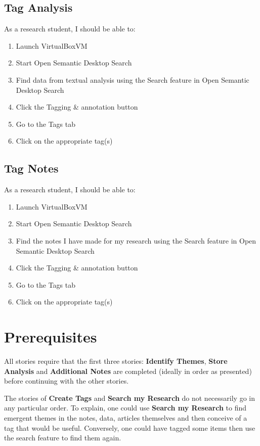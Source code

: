 \documentclass{article}
\begin{document}
\subsection*{Tag Analysis}

As a research student, I should be able to:
\begin{enumerate}
    \item Launch VirtualBoxVM
    \item Start Open Semantic Desktop Search
    \item Find data from textual analysis using the Search feature in Open Semantic Desktop Search
    \item Click the Tagging \& annotation button
    \item Go to the Tags tab
    \item Click on the appropriate tag(s)
\end{enumerate}

\subsection*{Tag Notes}

As a research student, I should be able to:
\begin{enumerate}
    \item Launch VirtualBoxVM
    \item Start Open Semantic Desktop Search
    \item Find the notes I have made for my research using the Search feature in Open Semantic Desktop Search
    \item Click the Tagging \& annotation button
    \item Go to the Tags tab
    \item Click on the appropriate tag(s)
\end{enumerate}

\section*{Prerequisites}

All stories require that the first three stories: \textbf{Identify Themes}, \textbf{Store Analysis} and \textbf{Additional Notes} are completed (ideally in order as presented) before continuing with the other stories.

The stories of \textbf{Create Tags} and \textbf{Search my Research} do not necessarily go in any particular order. To explain, one could use \textbf{Search my Research} to find emergent themes in the notes, data, articles themselves and then conceive of a tag that would be useful. Conversely, one could have tagged some items then use the search feature to find them again. 
\end{document}
